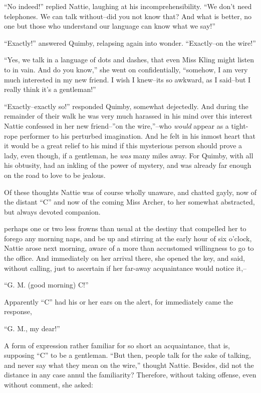 ``No indeed!'' replied Nattie, laughing at his incomprehensibility. ``We
don't need telephones. We can talk without--did you not know that? And
what is better, no one but those who understand our language can know
what we say!''

``Exactly!'' answered Quimby, relapsing again into wonder. ``Exactly--on
the wire!''

``Yes, we talk in a language of dots and dashes, that even Miss Kling
might listen to in vain. And do you know,'' she went on confidentially,
``somehow, I am very much interested in my new friend. I wish I knew--its
so awkward, as I said--but I really think it's a gentleman!''

``Exactly--exactly so!'' responded Quimby, somewhat dejectedly. And during
the remainder of their walk he was very much harassed in his mind over
this interest Nattie confessed in her new friend--''on the wire,''--who
\emph{would} appear as a tight-rope performer to his perturbed imagination.
And he felt in his inmost heart that it would be a great relief to his
mind if this mysterious person should prove a lady, even though, if a
gentleman, he \emph{was} many miles away. For Quimby, with all his obtusity,
had an inkling of the power of mystery, and was already far enough on
the road to love to be jealous.

Of these thoughts Nattie was of course wholly unaware, and chatted
gayly, now of the distant ``C'' and now of the coming Miss Archer, to
her somewhat abstracted, but always devoted companion.
\ifChapterNoPageBreak
\clearpage%
\fi



 perhaps one or two less frowns than usual at the destiny that
compelled her to forego any morning naps, and be up and stirring at the
early hour of six o'clock, Nattie arose next morning, aware of a more
than accustomed willingness to go to the office. And immediately on her
arrival there, she opened the key, and said, without calling, just to
ascertain if her far-away acquaintance would notice it,--

``G. M. (good morning) C!''

Apparently ``C'' had his or her ears on the alert, for immediately came
the response,

``G. M., my dear!''

A form of expression rather familiar for so short an acquaintance, that
is, supposing ``C'' to be a gentleman. ``But then, people talk for the sake
of talking, and never say what they mean on the wire,'' thought Nattie.
Besides, did not the distance in any case annul the familiarity?
Therefore, without taking offense, even without comment, she asked:

